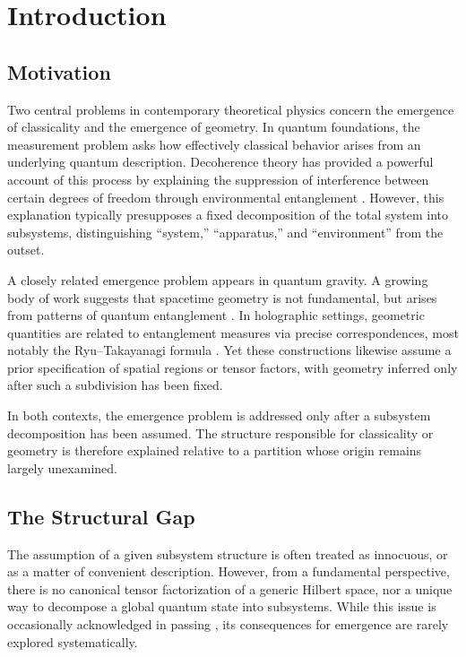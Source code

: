 \documentclass[12pt,a4paper]{article}
\begin{document}
\section{Introduction}

\subsection{Motivation}

Two central problems in contemporary theoretical physics concern the emergence of classicality and the emergence of geometry. 
In quantum foundations, the measurement problem asks how effectively classical behavior arises from an underlying quantum description. 
Decoherence theory has provided a powerful account of this process by explaining the suppression of interference between certain degrees of freedom through environmental entanglement \cite{Zurek2003}. 
However, this explanation typically presupposes a fixed decomposition of the total system into subsystems, distinguishing ``system,'' ``apparatus,'' and ``environment'' from the outset.

A closely related emergence problem appears in quantum gravity. 
A growing body of work suggests that spacetime geometry is not fundamental, but arises from patterns of quantum entanglement \cite{Maldacena1999,VanRaamsdonk2010}. 
In holographic settings, geometric quantities are related to entanglement measures via precise correspondences, most notably the Ryu--Takayanagi formula \cite{RyuTakayanagi2006}. 
Yet these constructions likewise assume a prior specification of spatial regions or tensor factors, with geometry inferred only after such a subdivision has been fixed.

In both contexts, the emergence problem is addressed only after a subsystem decomposition has been assumed.
The structure responsible for classicality or geometry is therefore explained relative to a partition whose origin remains largely unexamined.

\subsection{The Structural Gap}

The assumption of a given subsystem structure is often treated as innocuous, or as a matter of convenient description. 
However, from a fundamental perspective, there is no canonical tensor factorization of a generic Hilbert space, nor a unique way to decompose a global quantum state into subsystems.
While this issue is occasionally acknowledged in passing \cite{Zanardi2004,Viola2004}, its consequences for emergence are rarely explored systematically.
\end{document}
